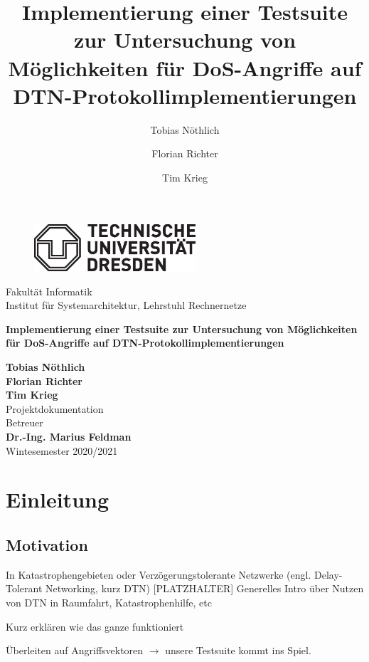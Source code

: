 \documentclass{article}
\author[1]{Tobias Nöthlich}
\author[1]{Florian Richter}
\author[1]{Tim Krieg}
\title{Implementierung einer Testsuite zur Untersuchung von Möglichkeiten für DoS-Angriffe auf DTN-Protokollimplementierungen}
\begin{document}


\begin{titlepage}

\begin{figure}[h]
\begin{flushleft}
\includegraphics[trim= 0 0 0 0 , clip, width=6cm]{img/logo.eps} 
\end{flushleft}
\end{figure}
\noindent
Fakultät Informatik\\
Institut für Systemarchitektur, Lehrstuhl Rechnernetze \\

\begin{center}
\Huge
\textbf{Implementierung einer Testsuite zur Untersuchung von Möglichkeiten für DoS-Angriffe auf DTN-Protokollimplementierungen} \\
\normalsize
\vspace{1cm}

\end{center}

\vspace{1cm}
\noindent
\textbf{\large{Tobias Nöthlich}} \\
\textbf{\large{Florian Richter}} \\
\textbf{\large{Tim Krieg}} \\

\vspace{1cm}
\noindent
{\LARGE Projektdokumentation} \\

\vspace{1cm}
\noindent
Betreuer\\
\textbf{\large{Dr.-Ing. Marius Feldman}} \\

\vspace{1cm}
\noindent
Wintesemester 2020/2021

\end{titlepage}
\tableofcontents

\newpage

\section{Einleitung}

\subsection{Motivation}
In Katastrophengebieten oder Verzögerungstolerante Netzwerke (engl. Delay-Tolerant Networking, kurz DTN)  
[PLATZHALTER] Generelles Intro über Nutzen von DTN in Raumfahrt, Katastrophenhilfe, etc \par
[PLATZHALTER] Kurz erklären wie das ganze funktioniert\par
[PLATZHALTER]Überleiten auf Angriffsvektoren $\rightarrow$ unsere Testsuite kommt ins Spiel.\par
\end{document}

